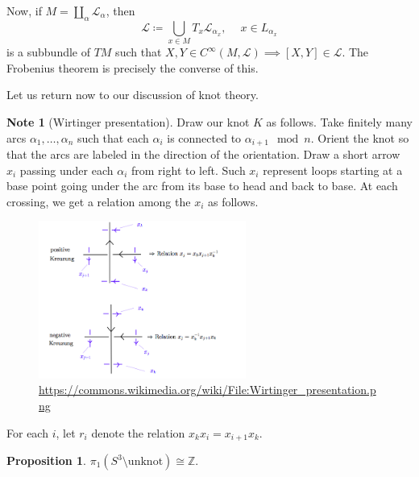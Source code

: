 \documentclass[10pt,letterpaper,cm]{nupset}
\theoremstyle{definition}
\newtheorem{note}[definition]{Note}
\theoremstyle{theorem}
\newtheorem{prop}[definition]{Proposition}
\theoremstyle{remark}
\renewcommand{\L}{\mathscr L}
\newcommand{\Z}{\mathbb Z}
\newcommand{\1}{\mathbb{1}}
\newcommand{\0}{\vec 0}
\begin{document}
\medskip

Now, if $M = \coprod_{\alpha} \L_{\alpha}$, then $$\L \coloneqq  \bigcup_{x\in M} T_x \L_{\alpha_x}, \ \quad  x\in L_{\alpha_x}$$ is a subbundle of $TM$ such that $X, Y \in C^{\infty}(M, \L) \implies \left[X, Y\right] \in \L$. The Frobenius theorem is precisely the converse of this. 


\bigskip

Let us return now to our discussion of knot theory.

\begin{note}[Wirtinger presentation] 
Draw our knot $K$ as follows. Take finitely many arcs $\alpha_1, \ldots, \alpha_n$ such that each $\alpha_i$ is connected to $\alpha_{i+1} \mod n$. Orient the knot so that the arcs are labeled in the direction of the orientation. Draw a short arrow $x_i$ passing under each $\alpha_i$ from right to left. Such $x_i$ represent loops starting at a base point going under the arc from its base to head and back to base. At each crossing, we get a relation among the $x_i$ as follows.
\begin{figure}[H]
\centering
\includegraphics[width=68mm]{Wirtinger_presentation.png}
\caption{\url{https://commons.wikimedia.org/wiki/File:Wirtinger_presentation.png} \label{overflow}}
\end{figure}
For each $i$, let $r_i$ denote the relation $x_kx_i = x_{i+1}x_k$.
\end{note}

\begin{prop}
$\pi_1(S^3 \setminus \mathrm{unknot})\cong \Z$.
\end{prop}
\end{document}

